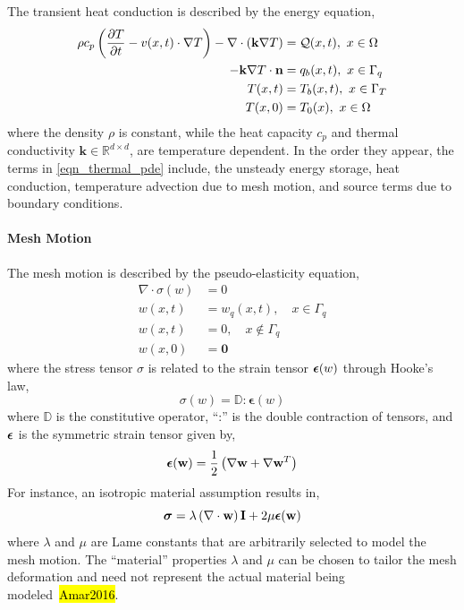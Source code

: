 The transient heat conduction is described by the energy equation,
\begin{subequations}
    \begin{align}
        \rho c_p\left(\ppt{T} - v(x,t)\cdot\nabla T\right) - \nabla\cdot (\mathbf{k}\nabla T) &= \cQ(x,t),\ x\in\Omega \label{eqn_thermal_pde}\\
        -\mathbf{k}\nabla T\cdot \vn &= q_b(x,t),\ x\in\Gamma_q\label{eqn_thermal_bc_neumann}\\
        T(x,t) &= T_b(x,t),\ x\in\Gamma_T\label{eqn_thermal_bc_dirichlet}\\
        T(x,0) &= T_0(x),\ x\in\Omega\label{eqn_thermal_ic}
    \end{align}\label{eqn_governing_equations}
\end{subequations}
where the density $\rho$ is constant, while the heat capacity $c_p$ and thermal conductivity $\mathbf{k}\in\mathbb{R}^{d\times d}$, are temperature dependent. In the order they appear, the terms in \cref{eqn_thermal_pde} include, the unsteady energy storage, heat conduction, temperature advection due to mesh motion, and source terms due to boundary conditions.

\paragraph*{Mesh Motion} The mesh motion is described by the pseudo-elasticity equation,
\begin{subequations}
    \begin{align}
        \nabla\cdot\sigma(w) &= 0\label{eqn_elasticity_pde}\\
        w(x,t) &= w_q(x,t),\quad x\in\Gamma_q\label{eqn_displacement_heated_bc}\\
        w(x,t) &= 0,\quad x\notin \Gamma_q\label{eqn_displacement_unheated_bc}\\
        w(x,0) &= \boldsymbol{0}\label{eqn_displacement_initial_condition}
    \end{align}
\end{subequations}
where the stress tensor $\sigma$ is related to the strain tensor $\boldsymbol{\epsilon}(w)$ through Hooke's law,
\[
    \sigma(w) = \mathbb{D}:\boldsymbol{\epsilon}(w)
\]
where $\mathbb{D}$ is the constitutive operator, ``:'' is the double contraction of tensors, and $\boldsymbol{\epsilon}$ is the symmetric strain tensor given by,
\[
    \boldsymbol{\epsilon}(\mathbf{w}) = \frac{1}{2}\left(\nabla\mathbf{w} + \nabla\mathbf{w}^T\right)
\]
For instance, an isotropic material assumption results in,
\[
    \boldsymbol{\sigma} = \lambda\left(\nabla\cdot\mathbf{w}\right) \mathbf{I} + 2\mu\boldsymbol{\epsilon}(\mathbf{w})
\]
where $\lambda$ and $\mu$ are Lame constants that are arbitrarily selected to model the mesh motion. The ``material'' properties $\lambda$ and $\mu$ can be chosen to tailor the mesh deformation and need not represent the actual material being modeled~\hl{Amar2016}. 

